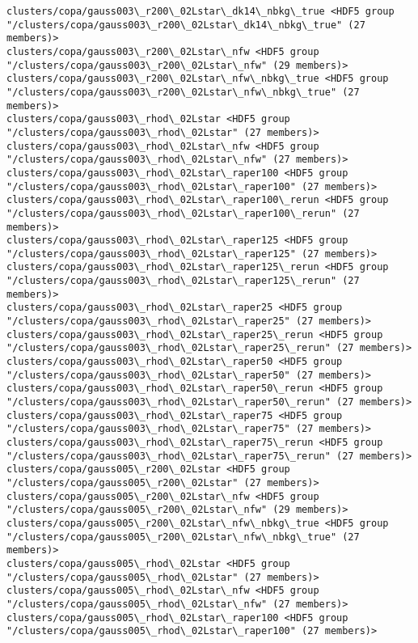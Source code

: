 \documentclass[11pt]{article}
\begin{document}
\begin{Verbatim}[commandchars=\\\{\}]
clusters/copa/gauss003\_r200\_02Lstar\_dk14\_nbkg\_true <HDF5 group "/clusters/copa/gauss003\_r200\_02Lstar\_dk14\_nbkg\_true" (27 members)>
clusters/copa/gauss003\_r200\_02Lstar\_nfw <HDF5 group "/clusters/copa/gauss003\_r200\_02Lstar\_nfw" (29 members)>
clusters/copa/gauss003\_r200\_02Lstar\_nfw\_nbkg\_true <HDF5 group "/clusters/copa/gauss003\_r200\_02Lstar\_nfw\_nbkg\_true" (27 members)>
clusters/copa/gauss003\_rhod\_02Lstar <HDF5 group "/clusters/copa/gauss003\_rhod\_02Lstar" (27 members)>
clusters/copa/gauss003\_rhod\_02Lstar\_nfw <HDF5 group "/clusters/copa/gauss003\_rhod\_02Lstar\_nfw" (27 members)>
clusters/copa/gauss003\_rhod\_02Lstar\_raper100 <HDF5 group "/clusters/copa/gauss003\_rhod\_02Lstar\_raper100" (27 members)>
clusters/copa/gauss003\_rhod\_02Lstar\_raper100\_rerun <HDF5 group "/clusters/copa/gauss003\_rhod\_02Lstar\_raper100\_rerun" (27 members)>
clusters/copa/gauss003\_rhod\_02Lstar\_raper125 <HDF5 group "/clusters/copa/gauss003\_rhod\_02Lstar\_raper125" (27 members)>
clusters/copa/gauss003\_rhod\_02Lstar\_raper125\_rerun <HDF5 group "/clusters/copa/gauss003\_rhod\_02Lstar\_raper125\_rerun" (27 members)>
clusters/copa/gauss003\_rhod\_02Lstar\_raper25 <HDF5 group "/clusters/copa/gauss003\_rhod\_02Lstar\_raper25" (27 members)>
clusters/copa/gauss003\_rhod\_02Lstar\_raper25\_rerun <HDF5 group "/clusters/copa/gauss003\_rhod\_02Lstar\_raper25\_rerun" (27 members)>
clusters/copa/gauss003\_rhod\_02Lstar\_raper50 <HDF5 group "/clusters/copa/gauss003\_rhod\_02Lstar\_raper50" (27 members)>
clusters/copa/gauss003\_rhod\_02Lstar\_raper50\_rerun <HDF5 group "/clusters/copa/gauss003\_rhod\_02Lstar\_raper50\_rerun" (27 members)>
clusters/copa/gauss003\_rhod\_02Lstar\_raper75 <HDF5 group "/clusters/copa/gauss003\_rhod\_02Lstar\_raper75" (27 members)>
clusters/copa/gauss003\_rhod\_02Lstar\_raper75\_rerun <HDF5 group "/clusters/copa/gauss003\_rhod\_02Lstar\_raper75\_rerun" (27 members)>
clusters/copa/gauss005\_r200\_02Lstar <HDF5 group "/clusters/copa/gauss005\_r200\_02Lstar" (27 members)>
clusters/copa/gauss005\_r200\_02Lstar\_nfw <HDF5 group "/clusters/copa/gauss005\_r200\_02Lstar\_nfw" (29 members)>
clusters/copa/gauss005\_r200\_02Lstar\_nfw\_nbkg\_true <HDF5 group "/clusters/copa/gauss005\_r200\_02Lstar\_nfw\_nbkg\_true" (27 members)>
clusters/copa/gauss005\_rhod\_02Lstar <HDF5 group "/clusters/copa/gauss005\_rhod\_02Lstar" (27 members)>
clusters/copa/gauss005\_rhod\_02Lstar\_nfw <HDF5 group "/clusters/copa/gauss005\_rhod\_02Lstar\_nfw" (27 members)>
clusters/copa/gauss005\_rhod\_02Lstar\_raper100 <HDF5 group "/clusters/copa/gauss005\_rhod\_02Lstar\_raper100" (27 members)>

\end{Verbatim}
\end{document}
